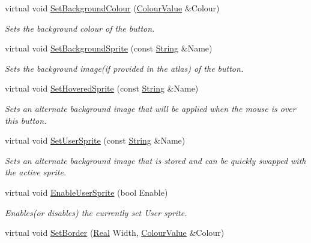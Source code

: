 \begin{DoxyCompactItemize}
virtual void \hyperlink{classphys_1_1UI_1_1Button_ac4ce81ec9cdc97ac3d29aed5031c5ac6}{SetBackgroundColour} (\hyperlink{classphys_1_1ColourValue}{ColourValue} \&Colour)
\begin{DoxyCompactList}\small\item\em Sets the background colour of the button. \item\end{DoxyCompactList}\item 
virtual void \hyperlink{classphys_1_1UI_1_1Button_a7cecb219a59fb55db6ac0070359bb23f}{SetBackgroundSprite} (const \hyperlink{namespacephys_aa03900411993de7fbfec4789bc1d392e}{String} \&Name)
\begin{DoxyCompactList}\small\item\em Sets the background image(if provided in the atlas) of the button. \item\end{DoxyCompactList}\item 
virtual void \hyperlink{classphys_1_1UI_1_1Button_a12cfac0dcc6324694f29968c0ca25d03}{SetHoveredSprite} (const \hyperlink{namespacephys_aa03900411993de7fbfec4789bc1d392e}{String} \&Name)
\begin{DoxyCompactList}\small\item\em Sets an alternate background image that will be applied when the mouse is over this button. \item\end{DoxyCompactList}\item 
virtual void \hyperlink{classphys_1_1UI_1_1Button_a8c3a5657daf79a882f71691e91785d4d}{SetUserSprite} (const \hyperlink{namespacephys_aa03900411993de7fbfec4789bc1d392e}{String} \&Name)
\begin{DoxyCompactList}\small\item\em Sets an alternate background image that is stored and can be quickly swapped with the active sprite. \item\end{DoxyCompactList}\item 
virtual void \hyperlink{classphys_1_1UI_1_1Button_a4fe6560484f1d78b08c96eaf967404d2}{EnableUserSprite} (bool Enable)
\begin{DoxyCompactList}\small\item\em Enables(or disables) the currently set User sprite. \item\end{DoxyCompactList}\item 
virtual void \hyperlink{classphys_1_1UI_1_1Button_a94a4296fd5b2153f10e77aca08481d15}{SetBorder} (\hyperlink{namespacephys_af7eb897198d265b8e868f45240230d5f}{Real} Width, \hyperlink{classphys_1_1ColourValue}{ColourValue} \&Colour)

\end{DoxyCompactItemize}
